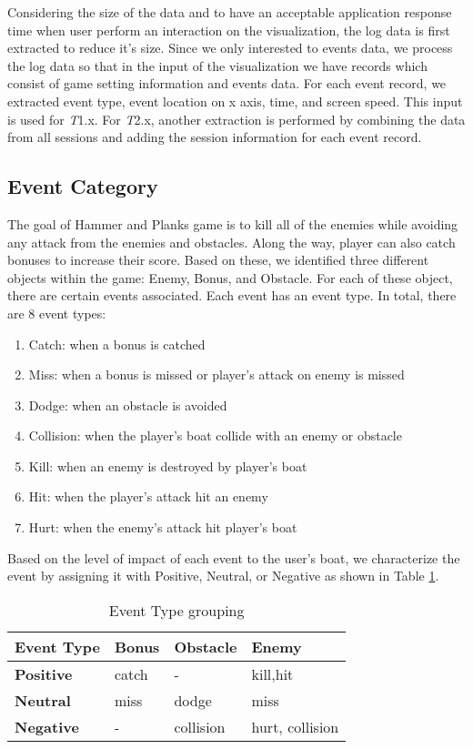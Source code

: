 Considering the size of the data and to have an acceptable application response time when user perform an interaction on the visualization, the log data is first extracted to reduce it's size. Since we only interested to events data, we process the log data so that in the input of the visualization we have records which consist of game setting information and events data. For each event record, we extracted event type, event location on x axis, time, and screen speed. This input is used for \textit{T}1.x. For \textit{T}2.x, another extraction is performed by combining the data from all sessions and adding the session information for each event record.
\subsection{Event Category}
The goal of Hammer and Planks game is to kill all of the enemies while avoiding any attack from the enemies and obstacles\cite{diloreto}. Along the way, player can also catch bonuses to increase their score. Based on these, we identified three different objects within the game: Enemy, Bonus, and Obstacle. For each of these object, there are certain events associated. Each event has an event type. In total, there are 8 event types:
\newcommand{\events}[2]{$#1 _ #2$}	
\begin{enumerate}[label=({\arabic*})]
\item Catch: when a bonus is catched
\item Miss: when a bonus is missed or player's attack on enemy is missed
\item Dodge: when an obstacle is avoided
\item Collision: when the player's boat collide with an enemy or obstacle
\item Kill: when an enemy is destroyed by player's boat
\item Hit: when the player's attack hit an enemy
\item Hurt: when the enemy's attack hit player's boat
\end{enumerate}

Based on the level of impact of each event to the user's boat, we characterize the event by assigning it with Positive, Neutral, or Negative as shown in Table \ref{tblEventType}.
\begin{table}[h]
\begin{center}
    \begin{tabular}{| l | l | l | l |}
    \hline
    Event Type & Bonus & Obstacle & Enemy \\ \hline\hline
    \textbf{Positive} & catch & - & kill,hit\\ \hline
    \textbf{Neutral} & miss & dodge & miss\\ \hline
    \textbf{Negative} & - & collision & hurt, collision\\
    \hline
    \end{tabular}
    \caption {Event Type grouping}
    \label{tblEventType}
\end{center}
\end{table}


